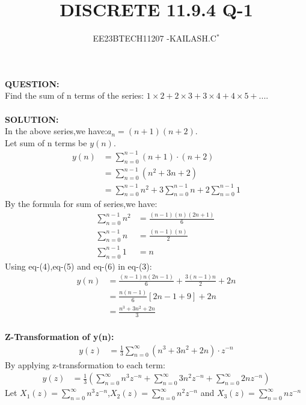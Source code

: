 \documentclass[journal,12pt,twocolumn]{IEEEtran}
\theoremstyle{remark}
\begin{document}

\vspace{3cm}

\title{DISCRETE 11.9.4 Q-1}
\author{EE23BTECH11207 -KAILASH.C$^{*}$%
}
\maketitle
\newpage
\bigskip

\renewcommand{\thefigure}{\theenumi}
\renewcommand{\thetable}{\theenumi}


\textbf{QUESTION:}\\
Find the sum of n terms of the series:
$1\times2+2\times3+3\times4+4\times5+....$\\ \\
\textbf{SOLUTION:}\\
In the above series,we have:$a_n=(n+1)(n+2)$.\\
Let sum of n terms be $y(n)$.
\begin{align}
     y(n)&=\sum_{n=0}^{n-1} (n+1) \cdot (n+2)\\
     &=\sum_{n=0}^{n-1} (n^2 + 3n + 2)\\
     &=\sum_{n=0}^{n-1} n^2+3\sum_{n=0}^{n-1} n+2 \sum_{n=0}^{n-1} 1
\end{align}
By the formula for sum of series,we have:
\begin{align}
    \sum_{n=0}^{n-1} n^2&=\frac{(n-1)(n)(2n+1)}{6}\ \\
    \sum_{n=0}^{n-1} n&=\frac{(n-1)(n)}{2}\\
    \sum_{n=0}^{n-1} 1&=n
\end{align}
Using eq-(4),eq-(5) and eq-(6) in eq-(3):
\begin{align}
y(n)&=\frac{(n-1)n(2n-1)}{6} + \frac{3(n-1)n}{2} + 2n \\
    &=\frac{n(n-1)}{6}[2n-1+9]+2n\\
    &=\frac{n^3+3n^2+2n}{3}
\end{align}\\
\textbf{Z-Transformation of y(n):}\\
\begin{align}
y(z)&=\frac{1}{3} \sum_{n=0}^{\infty} (n^3 + 3n^2 + 2n) \cdot z^{-n}
\end{align}
By applying z-transformation to each term:
\begin{align}
    y(z)&=\frac{1}{3}\left(\sum_{n=0}^{\infty}n^3 z^{-n}+\sum_{n=0}^{\infty}3n^2z^{-n}+\sum_{n=0}^{\infty}2nz^{-n}\right)
\end{align}
Let $X_1(z)=\sum_{n=0}^{\infty}n^3 z^{-n}$,$X_2(z)=\sum_{n=0}^{\infty}n^2z^{-n}$ and $X_3(z)=\sum_{n=0}^{\infty}nz^{-n}$\\
\end{document}
